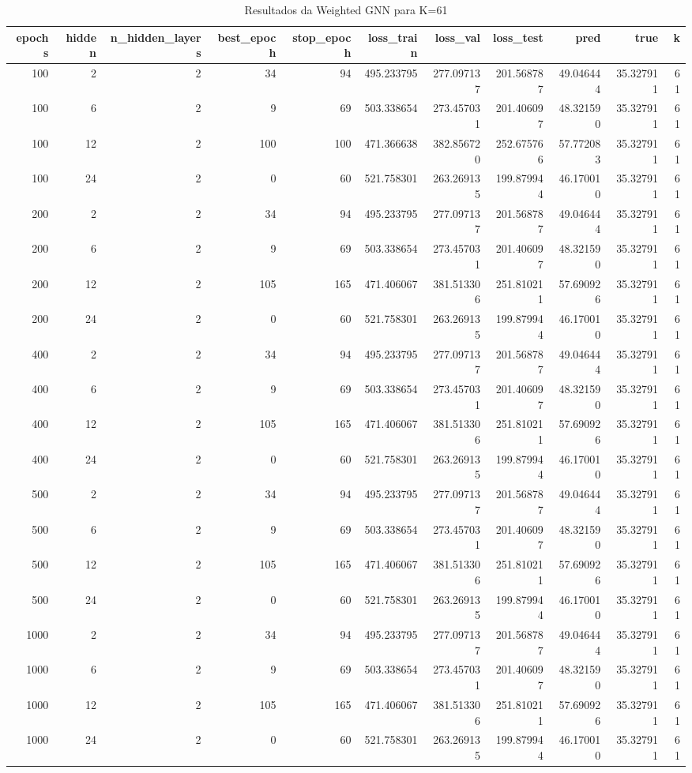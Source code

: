 \begin{table}
\caption{Resultados da Weighted GNN para K=61}
\label{tab:weighted_gnn_results_k61}
\begin{tabular}{rrrrrrrrrrr}
\toprule
epochs & hidden & n\_hidden\_layers & best\_epoch & stop\_epoch & loss\_train & loss\_val & loss\_test & pred & true & k \\
\midrule
100 & 2 & 2 & 34 & 94 & 495.233795 & 277.097137 & 201.568787 & 49.046444 & 35.327911 & 61 \\
100 & 6 & 2 & 9 & 69 & 503.338654 & 273.457031 & 201.406097 & 48.321590 & 35.327911 & 61 \\
100 & 12 & 2 & 100 & 100 & 471.366638 & 382.856720 & 252.675766 & 57.772083 & 35.327911 & 61 \\
100 & 24 & 2 & 0 & 60 & 521.758301 & 263.269135 & 199.879944 & 46.170010 & 35.327911 & 61 \\
200 & 2 & 2 & 34 & 94 & 495.233795 & 277.097137 & 201.568787 & 49.046444 & 35.327911 & 61 \\
200 & 6 & 2 & 9 & 69 & 503.338654 & 273.457031 & 201.406097 & 48.321590 & 35.327911 & 61 \\
200 & 12 & 2 & 105 & 165 & 471.406067 & 381.513306 & 251.810211 & 57.690926 & 35.327911 & 61 \\
200 & 24 & 2 & 0 & 60 & 521.758301 & 263.269135 & 199.879944 & 46.170010 & 35.327911 & 61 \\
400 & 2 & 2 & 34 & 94 & 495.233795 & 277.097137 & 201.568787 & 49.046444 & 35.327911 & 61 \\
400 & 6 & 2 & 9 & 69 & 503.338654 & 273.457031 & 201.406097 & 48.321590 & 35.327911 & 61 \\
400 & 12 & 2 & 105 & 165 & 471.406067 & 381.513306 & 251.810211 & 57.690926 & 35.327911 & 61 \\
400 & 24 & 2 & 0 & 60 & 521.758301 & 263.269135 & 199.879944 & 46.170010 & 35.327911 & 61 \\
500 & 2 & 2 & 34 & 94 & 495.233795 & 277.097137 & 201.568787 & 49.046444 & 35.327911 & 61 \\
500 & 6 & 2 & 9 & 69 & 503.338654 & 273.457031 & 201.406097 & 48.321590 & 35.327911 & 61 \\
500 & 12 & 2 & 105 & 165 & 471.406067 & 381.513306 & 251.810211 & 57.690926 & 35.327911 & 61 \\
500 & 24 & 2 & 0 & 60 & 521.758301 & 263.269135 & 199.879944 & 46.170010 & 35.327911 & 61 \\
1000 & 2 & 2 & 34 & 94 & 495.233795 & 277.097137 & 201.568787 & 49.046444 & 35.327911 & 61 \\
1000 & 6 & 2 & 9 & 69 & 503.338654 & 273.457031 & 201.406097 & 48.321590 & 35.327911 & 61 \\
1000 & 12 & 2 & 105 & 165 & 471.406067 & 381.513306 & 251.810211 & 57.690926 & 35.327911 & 61 \\
1000 & 24 & 2 & 0 & 60 & 521.758301 & 263.269135 & 199.879944 & 46.170010 & 35.327911 & 61 \\
\bottomrule
\end{tabular}
\end{table}
